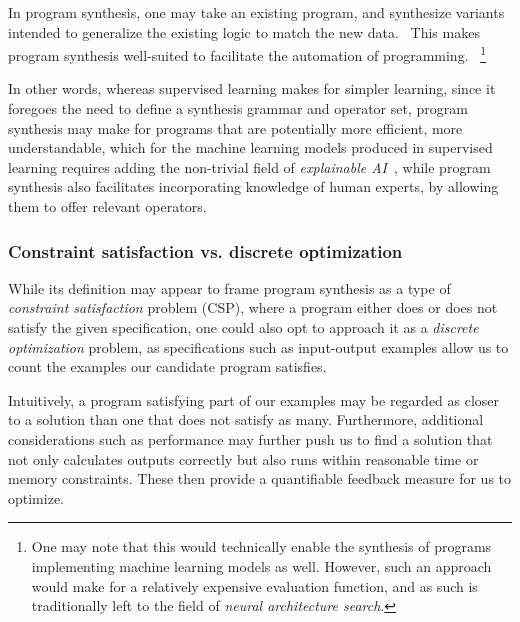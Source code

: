 \documentclass{article}
\begin{document}
In program synthesis, one may take an existing program, and synthesize variants intended to generalize the existing logic to match the new data.~\citep{myth}
This makes program synthesis well-suited to facilitate the automation of programming.%
~\footnote{
    One may note that this would technically enable the synthesis of programs implementing machine learning models as well.
    However, such an approach would make for a relatively expensive evaluation function,
    and as such is traditionally left to the field of \emph{neural architecture search}.
}

In other words, whereas supervised learning makes for simpler learning,
since it foregoes the need to define a synthesis grammar and operator set,
program synthesis may make for programs that are potentially more efficient,
more understandable,
which for the machine learning models produced in supervised learning requires adding the non-trivial field of \emph{explainable AI}~\citep{gunning2017explainable},
while program synthesis also facilitates incorporating knowledge of human experts,
by allowing them to offer relevant operators.

\subsubsection{Constraint satisfaction vs. discrete optimization}

While its definition may appear to frame program synthesis as a type of \emph{constraint satisfaction} problem (CSP),
where a program either does or does not satisfy the given specification,
one could also opt to approach it as a \emph{discrete optimization} problem,
as specifications such as input-output examples allow us to count the examples our candidate program satisfies.

Intuitively, a program satisfying part of our examples may be regarded as closer to a solution than one that does not satisfy as many.
Furthermore, additional considerations such as performance may further push us to find a solution that not only calculates outputs correctly but also runs within reasonable time or memory constraints.
These then provide a quantifiable feedback measure for us to optimize.
\end{document}
